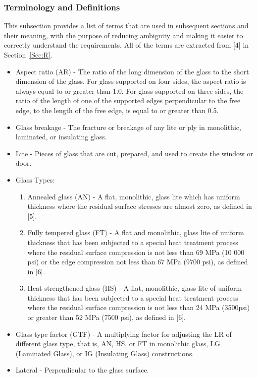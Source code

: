 \documentclass[12pt]{article}
\begin{document}
\subsubsection{Terminology and Definitions}
\label{Sec:TaD}
This subsection provides a list of terms that are used in subsequent sections and their meaning, with the purpose of reducing ambiguity and making it easier to correctly understand the requirements. All of the terms are extracted from [4] in Section~\ref{Sec:R}.
\begin{itemize}
\item{Aspect ratio (AR) - The ratio of the long dimension of the glass to the short dimension of the glass. For glass supported on four sides, the aspect ratio is always equal to or greater than 1.0. For glass supported on three sides, the ratio of the length of one of the supported edges perpendicular to the free edge, to the length of the free edge, is equal to or greater than 0.5.}
\item{Glass breakage - The fracture or breakage of any lite or ply in monolithic, laminated, or insulating glass.}
\item{Lite - Pieces of glass that are cut, prepared, and used to create the window or door.}
\item{Glass Types:}
\begin{enumerate}
\item{Annealed glass (AN) - A flat, monolithic, glass lite which has uniform thickness where the residual surface stresses are almost zero, as defined in [5].}
\item{Fully tempered glass (FT) - A flat and monolithic, glass lite of uniform thickness that has been subjected to a special heat treatment process where the residual surface compression is not less than 69 MPa (10 000 psi) or the edge compression not less than 67 MPa (9700 psi), as defined in [6].}
\item{Heat strengthened glass (HS) - A flat, monolithic, glass lite of uniform thickness that has been subjected to a special heat treatment process where the residual surface compression is not less than 24 MPa (3500psi) or greater than 52 MPa (7500 psi), as defined in [6].}
\end{enumerate}
\item{Glass type factor (GTF) - A multiplying factor for adjusting the LR of different glass type, that is, AN, HS, or FT in monolithic glass, LG (Laminated Glass), or IG (Insulating Glass) constructions.}
\item{Lateral - Perpendicular to the glass surface.}

\end{itemize}
\end{document}
